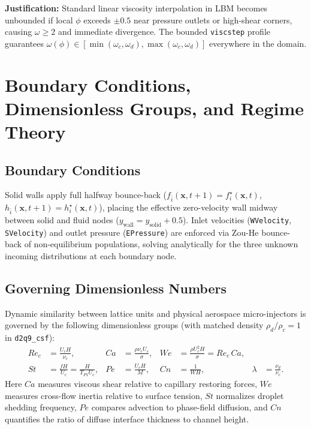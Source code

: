 \documentclass[11pt,a4paper]{article}
\begin{document}
\textbf{Justification:} Standard linear viscosity interpolation in LBM becomes unbounded if local $\phi$ exceeds $\pm 0.5$ near pressure outlets or high-shear corners, causing $\omega \ge 2$ and immediate divergence. The bounded \texttt{viscstep} profile guarantees $\omega(\phi) \in [\min(\omega_c, \omega_d), \max(\omega_c, \omega_d)]$ everywhere in the domain.

\section{Boundary Conditions, Dimensionless Groups, and Regime Theory}
\label{app:scaling}

\subsection{Boundary Conditions}

Solid walls apply full halfway bounce-back ($f_{\bar{i}}(\mathbf{x}, t+1) = f_i^{\star}(\mathbf{x}, t)$, $h_{\bar{i}}(\mathbf{x}, t+1) = h_i^{\star}(\mathbf{x}, t)$), placing the effective zero-velocity wall midway between solid and fluid nodes ($y_{\mathrm{wall}} = y_{\mathrm{solid}} + 0.5$). Inlet velocities (\texttt{WVelocity}, \texttt{SVelocity}) and outlet pressure (\texttt{EPressure}) are enforced via Zou-He bounce-back of non-equilibrium populations, solving analytically for the three unknown incoming distributions at each boundary node.

\subsection{Governing Dimensionless Numbers}

Dynamic similarity between lattice units and physical aerospace micro-injectors is governed by the following dimensionless groups (with matched density $\rho_d / \rho_c = 1$ in \texttt{d2q9\_csf}):
\begin{align}
    Re_c &= \frac{U_c H}{\nu_c}, & Ca &= \frac{\rho \nu_c U_c}{\sigma}, & We &= \frac{\rho U_c^2 H}{\sigma} = Re_c\,Ca, \\
    St &= \frac{f H}{U_c} = \frac{H}{T_{P1} U_c}, & Pe &= \frac{U_c H}{M}, & Cn &= \frac{1}{W H}, & \lambda &= \frac{\nu_d}{\nu_c}.
\end{align}
Here $Ca$ measures viscous shear relative to capillary restoring forces, $We$ measures cross-flow inertia relative to surface tension, $St$ normalizes droplet shedding frequency, $Pe$ compares advection to phase-field diffusion, and $Cn$ quantifies the ratio of diffuse interface thickness to channel height.
\end{document}
